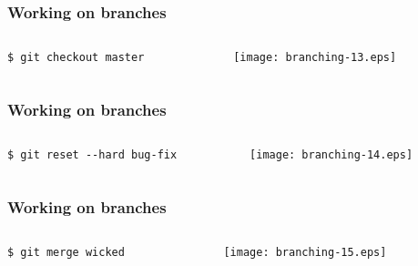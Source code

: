 \documentclass[english]{beamer}
\newcommand{\CMD}[1]{%
\texttt{\textcolor{code-green}{#1}}%
}
\begin{document}
\begin{frame}
\frametitle{Working on branches}

\begin{columns}[t]
        \begin{column}[T]{.5\textwidth}
                {\small
                \CMD{\$ git checkout master} \\
                }
        \end{column}
        \begin{column}[T]{.5\textwidth}
                \texttt{[image: branching-13.eps]}
        \end{column}
\end{columns}
\end{frame}

\begin{frame}
\frametitle{Working on branches}

\begin{columns}[t]
        \begin{column}[T]{.5\textwidth}
                {\small
                \CMD{\$ git reset {-}-hard bug-fix} \\
                }
        \end{column}
        \begin{column}[T]{.5\textwidth}
                \texttt{[image: branching-14.eps]}
        \end{column}
\end{columns}
\end{frame}

\begin{frame}
\frametitle{Working on branches}

\begin{columns}[t]
        \begin{column}[T]{.5\textwidth}
                {\small
                \CMD{\$ git merge wicked} \\
                }
        \end{column}
        \begin{column}[T]{.5\textwidth}
                \texttt{[image: branching-15.eps]}
        \end{column}
\end{columns}
\end{frame}
\end{document}
